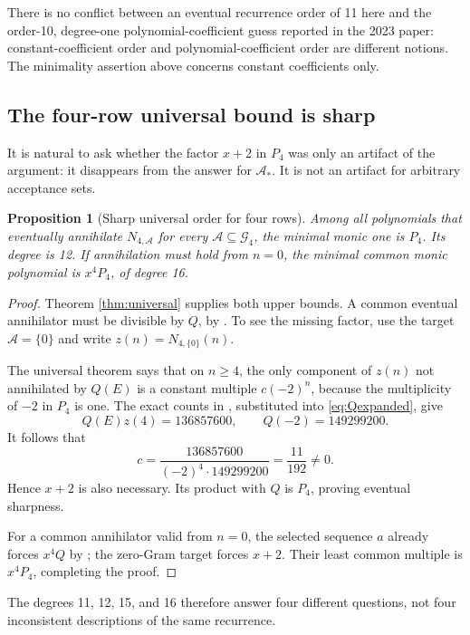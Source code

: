\documentclass[11pt,letterpaper]{article}
\newtheorem{proposition}[theorem]{Proposition}
\theoremstyle{definition}
\newcommand{\Astar}{\mathcal A_*}
\newcommand{\1}{\mathbf 1}
\begin{document}
There is no conflict between an eventual recurrence order of 11 here and the
order-10, degree-one polynomial-coefficient guess reported in the 2023 paper:
constant-coefficient order and polynomial-coefficient order are different
notions. The minimality assertion above concerns constant coefficients only.

\subsection{The four-row universal bound is sharp}
\label{sec:sharpness}
It is natural to ask whether the factor $x+2$ in $P_4$ was only an artifact of
the argument: it disappears from the answer for $\Astar$. It is not an artifact
for arbitrary acceptance sets.

\begin{proposition}[Sharp universal order for four rows]\label{prop:sharp}
Among all polynomials that eventually annihilate $N_{4,\mathcal A}$ for
\emph{every} $\mathcal A\subseteq\mathcal G_4$, the minimal monic one is $P_4$.
Its degree is 12. If annihilation must hold from $n=0$, the minimal common
monic polynomial is $x^4P_4$, of degree 16.
\end{proposition}
\begin{proof}
Theorem \ref{thm:universal} supplies both upper bounds. A common eventual
annihilator must be divisible by $Q$, by . To see the missing
factor, use the target $\mathcal A=\{0\}$ and write
$z(n)=N_{4,\{0\}}(n)$.

The universal theorem says that on $n\ge4$, the only component of $z(n)$ not
annihilated by $Q(E)$ is a constant multiple $c(-2)^n$, because the multiplicity
of $-2$ in $P_4$ is one. The exact counts in , substituted
into \eqref{eq:Qexpanded}, give
\[
 Q(E)z(4)=136857600,
 \qquad Q(-2)=149299200.
\]
It follows that
\begin{equation}\label{eq:minus2}
 c=\frac{136857600}{(-2)^4\cdot149299200}=\frac{11}{192}\ne0.
\end{equation}
Hence $x+2$ is also necessary. Its product with $Q$ is $P_4$, proving eventual
sharpness.

For a common annihilator valid from $n=0$, the selected sequence $a$ already
forces $x^4Q$ by ; the zero-Gram target forces $x+2$.
Their least common multiple is $x^4P_4$, completing the proof.
\end{proof}

The degrees 11, 12, 15, and 16 therefore answer four different questions, not
four inconsistent descriptions of the same recurrence.
\end{document}
